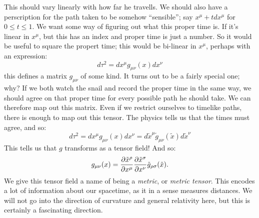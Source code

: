 This should vary linearly with how far he travells. We should also have a perscription for the path taken to be somehow ``sensible''; say $x^\mu + tdx^\mu$ for $0 \leq t \leq 1$. We want some way of figuring out what this proper time is. If it's linear in $x^\mu$, but this has an index and proper time is just a number. So it would be useful to square the propert time; this would be bi-linear in $x^\mu$, perhaps with an expression:
\begin{equation}
    d\tau^2 = dx^\mu g_{\mu\nu}(x)dx^\nu
\end{equation}
this defines a matrix $g_{\mu\nu}$ of some kind. It turns out to be a fairly special one; why? If we both watch the snail and record the proper time in the same way, we should agree on that proper time for every possible path he should take. We can therefore map out this matrix. Even if we restrict ourselves to timelike paths, there is enough to map out this tensor. The physics tells us that the times must agree, and so:
\begin{equation}\label{eq-dtau2WC}
    d\tau^2 = dx^\mu g_{\mu\nu}(x)dx^\nu = d\tilde{x}^\mu \tilde{g}_{\mu\nu}(\tilde{x})d\tilde{x}^\nu
\end{equation}
This tells us that $g$ transforms as a tensor field! And so:
\begin{equation}
    g_{\mu\nu}(x) = \frac{\partial \tilde{x}^\rho}{\partial x^\mu}\frac{\partial \tilde{x}^\sigma}{\partial x^\nu}\tilde{g}_{\rho\sigma}(\tilde{x}).
\end{equation}
We give this tensor field a name of being a \emph{metric}, or \emph{metric tensor}. This encodes a lot of information about our spacetime, as it in a sense measures distances. We will not go into the direction of curvature and general relativity here, but this is certainly a fascinating direction. 

